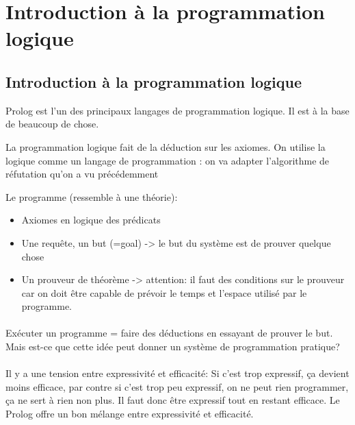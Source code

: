 \section{Introduction à la programmation logique}
\label{p2}
\subsection{Introduction à la programmation logique}

Prolog est l’un des principaux langages de programmation logique. Il est à la base de beaucoup de chose. 

La programmation logique fait de la déduction sur les axiomes.
On utilise la logique comme un langage de programmation : on va adapter l’algorithme de réfutation qu’on a vu précédemment

Le programme (ressemble à une théorie):
\begin{itemize}
	\item Axiomes en logique des prédicats
	\item Une requête, un but (=goal) -> le but du système est de prouver quelque chose
	\item Un prouveur de théorème -> attention: il faut des conditions sur le prouveur car on doit être capable de prévoir le temps et l’espace utilisé par le programme.
\end{itemize}

\paragraph{}
Exécuter un programme = faire des déductions en essayant de prouver le but. Mais est-ce que cette idée peut donner un système de programmation pratique?

\paragraph{}
Il y a une tension entre expressivité et efficacité: Si c’est trop expressif, ça devient moins efficace, par contre si c’est trop peu expressif, on ne peut rien programmer, ça ne sert à rien non plus. Il faut donc être expressif tout en restant efficace. Le Prolog offre un bon mélange entre expressivité et efficacité.

